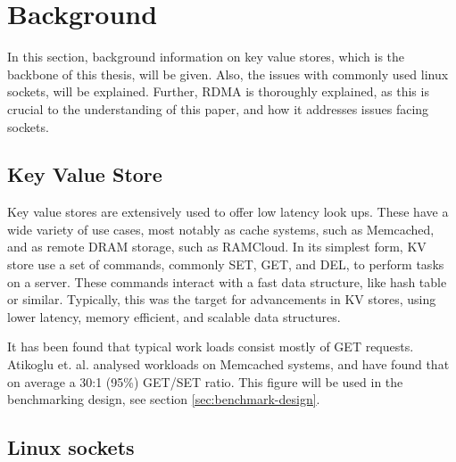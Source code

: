
\chapter{Background}\label{ch:background} %



\ifpdf
    \graphicspath{{7/figures/PNG/}{7/figures/PDF/}{7/figures/}}
\else
    \graphicspath{{7/figures/EPS/}{7/figures/}}
\fi


%
%
In this section, background information on key value stores, which is the backbone of this thesis, will be given.
Also, the issues with commonly used linux sockets, will be explained.
Further, RDMA is thoroughly explained, as this is crucial to the understanding of this paper, and how it addresses issues facing sockets.

\section[KV-store]{Key Value Store}\label{sec:kv-store}
Key value stores are extensively used to offer low latency look ups.
These have a wide variety of use cases, most notably as cache systems, such as Memcached\cite{memcached}, and as remote DRAM storage, such as RAMCloud\cite{ousterhout2010case}.
In its simplest form, KV store use a set of commands, commonly SET, GET, and DEL, to perform tasks on a server.
These commands interact with a fast data structure, like hash table or similar.
Typically, this was the target for advancements in KV stores, using lower latency, memory efficient, and scalable data structures.

It has been found that typical work loads consist mostly of GET requests.
Atikoglu et. al. analysed workloads on Memcached systems, and have found that on average a 30:1 (95\%) GET/SET ratio\cite{atikoglu2012workload}.
This figure will be used in the benchmarking design, see section \ref{sec:benchmark-design}.

\section[Linux scokets]{Linux sockets}\label{sec:linux-sockets}

